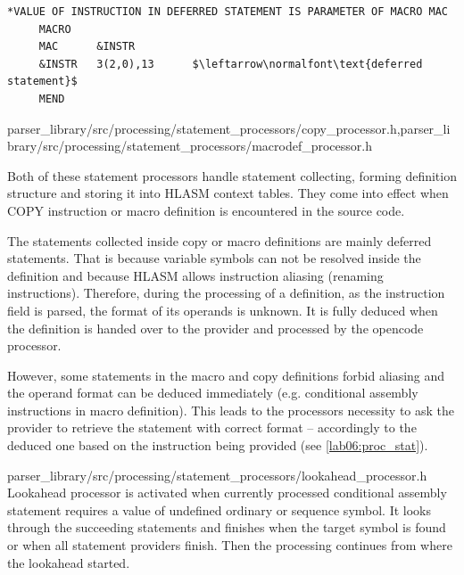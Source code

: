\begin{listing}[t]
	\begin{Verbatim}[commandchars=\\\{\},codes={\catcode`$=3}]
*VALUE OF INSTRUCTION IN DEFERRED STATEMENT IS PARAMETER OF MACRO MAC
     MACRO
     MAC      &INSTR
     &INSTR   3(2,0),13      $\leftarrow\normalfont\text{deferred statement}$
     MEND
	\end{Verbatim}
	\caption{An example of deferred statement in code.}
	\label{lst:def_stmt}
\end{listing}




{parser\_library/src/processing/statement\_processors/copy\_processor.h,parser\_library/src/processing/statement\_processors/macrodef\_processor.h}

Both of these statement processors handle statement collecting, forming definition structure and storing it into HLASM context tables. They come into effect when COPY instruction or macro definition is encountered in the source code. 

The statements collected inside copy or macro definitions are mainly deferred statements. That is because variable symbols can not be resolved inside the definition and because HLASM allows instruction aliasing (renaming instructions). Therefore, during the processing of a definition, as the instruction field is parsed, the format of its operands is unknown. It is fully deduced when the definition is handed over to the provider and processed by the opencode processor.

However, some statements in the macro and copy definitions forbid aliasing and the operand format can be deduced immediately (e.g. conditional assembly instructions in macro definition). This leads to the processors necessity to ask the provider to retrieve the statement with correct format -- accordingly to the deduced one based on the instruction being provided  (see \cref{lab06:proc_stat}).

{parser\_library/src/processing/statement\_processors/lookahead\_processor.h}
\label{lab06:look}
Lookahead processor is activated when currently processed conditional assembly statement requires a value of undefined ordinary or sequence symbol. It looks through the succeeding statements and finishes when the target symbol is found or when all statement providers finish. Then the processing continues from where the lookahead started.

